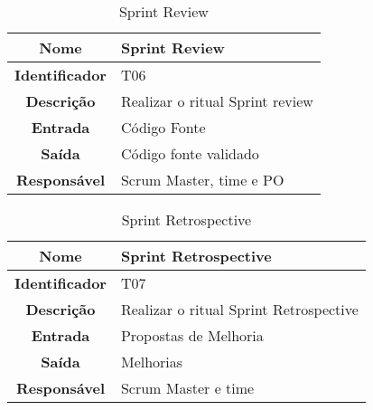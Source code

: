 {             \begin{table}[H]
                \centering
                \caption{Sprint Review}
                \begin{tabular}{c|p{10cm}}
                    \hline
                    \textbf{Nome}            & Sprint Review\\
                    \hline
                    \textbf{Identificador} & T06\\ 
                    \hline
                    \textbf{Descrição}   & Realizar o ritual Sprint review\\ 
                    \hline
                    \textbf{Entrada}           & Código Fonte\\
                    \hline
                    \textbf{Saída}            &  Código fonte validado\\
                    \hline
                    \textbf{Responsável}            & Scrum Master, time e PO\\
                    \hline                    
                \end{tabular}
            \end{table}

             \begin{table}[H]
                \centering
                \caption{Sprint Retrospective}
                \begin{tabular}{c|p{10cm}}
                    \hline
                    \textbf{Nome}            & Sprint Retrospective\\
                    \hline
                    \textbf{Identificador} & T07\\ 
                    \hline
                    \textbf{Descrição}   & Realizar o ritual Sprint Retrospective\\ 
                    \hline
                    \textbf{Entrada}           & Propostas de Melhoria\\
                    \hline
                    \textbf{Saída}            &  Melhorias\\
                    \hline
                    \textbf{Responsável}            & Scrum Master e  time \\
                    \hline                    
                \end{tabular}
            \end{table}

}




